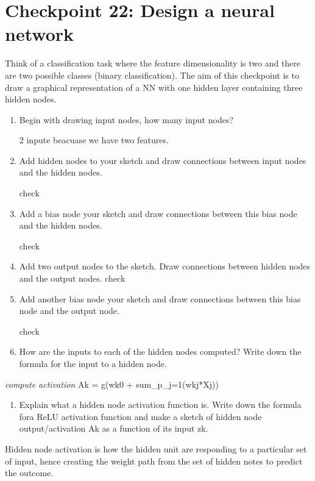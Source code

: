 \documentclass[
  letterpaper,
  DIV=11,
  numbers=noendperiod]{scrartcl}
\providecommand{\tightlist}{%
  \setlength{\itemsep}{0pt}\setlength{\parskip}{0pt}}\usepackage{longtable,booktabs,array}
\begin{document}
\hypertarget{checkpoint-22-design-a-neural-network}{%
\section{Checkpoint 22: Design a neural
network}\label{checkpoint-22-design-a-neural-network}}

Think of a classification task where the feature dimensionality is two
and there are two possible classes (binary classification). The aim of
this checkpoint is to draw a graphical representation of a NN with one
hidden layer containing three hidden nodes.

\begin{enumerate}
\def\labelenumi{(\alph{enumi})}
\item
  Begin with drawing input nodes, how many input nodes?

  2 inpute beacuase we have two features.
\item
  Add hidden nodes to your sketch and draw connections between input
  nodes and the hidden nodes.

  check
\item
  Add a bias node your sketch and draw connections between this bias
  node and the hidden nodes.

  check
\item
  Add two output nodes to the sketch. Draw connections between hidden
  nodes and the output nodes. check
\item
  Add another bias node your sketch and draw connections between this
  bias node and the output node.

  check
\item
  How are the inputs to each of the hidden nodes computed? Write down
  the formula for the input to a hidden node.
\end{enumerate}

\emph{compute activation} Ak = g(wk0 + sum\_p\_j=1(wkj*Xj))

\begin{enumerate}
\def\labelenumi{(\alph{enumi})}
\setcounter{enumi}{6}
\tightlist
\item
  Explain what a hidden node activation function is. Write down the
  formula fora ReLU activation function and make a sketch of hidden node
  output/activation Ak as a function of its input zk.
\end{enumerate}

Hidden node activation is how the hidden unit are responding to a
particular set of input, hence creating the weight path from the set of
hidden notes to predict the outcome.
\end{document}
